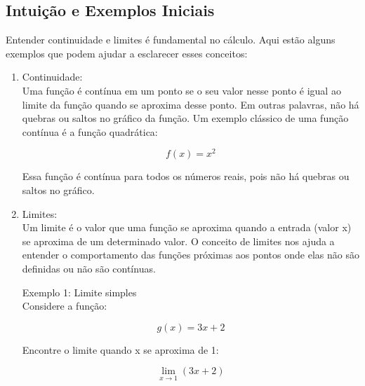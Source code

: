 \documentclass{article}
\begin{document}
\subsection{Intui\c c\~ao e Exemplos Iniciais}
Entender continuidade e limites é fundamental no cálculo. Aqui estão alguns exemplos que podem ajudar a esclarecer esses conceitos:

\begin{enumerate}
    \item Continuidade: \\
    Uma função é contínua em um ponto se o seu valor nesse ponto é igual ao limite da função quando se aproxima desse ponto. Em outras palavras, não há quebras ou saltos no gráfico da função. Um exemplo clássico de uma função contínua é a função quadrática:
    
    \begin{equation*}
        f(x) = x^2
    \end{equation*}
    
    Essa função é contínua para todos os números reais, pois não há quebras ou saltos no gráfico.

    \begin{center}
    \end{center}

    \item Limites: \\
    Um limite é o valor que uma função se aproxima quando a entrada (valor x) se aproxima de um determinado valor. O conceito de limites nos ajuda a entender o comportamento das funções próximas aos pontos onde elas não são definidas ou não são contínuas.
    
    Exemplo 1: Limite simples \\
    Considere a função:
    
    \begin{equation*}
        g(x) = 3x + 2
    \end{equation*}
    
    Encontre o limite quando x se aproxima de 1:
    
    \begin{equation*}
        \lim_{x \to 1} (3x + 2)
    \end{equation*}
    

\end{enumerate}
\end{document}
